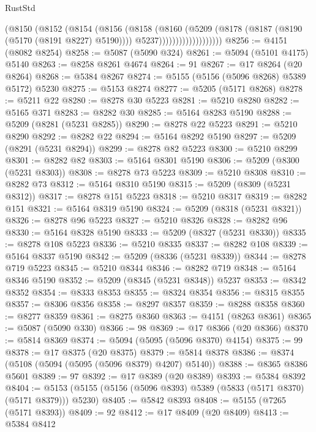 \begin{lexlean}{RustStd}
\begin{coremodule}
                            (@8150
                              (@8152
                                (@8154
                                  (@8156
                                    (@8158
                                      (@8160
                                        (@5209
                                          (@8178 (@8187 (@8190 (@5170 (@8191 @8227) @5190))))
                                          @5237)))))))))))))))))))
@8256 := @4151 (@8082 @8254)
@8258 := @5087 (@5090 @324)
@8261 := @5094 (@5101 @4175) @5140
@8263 := @8258 @8261 @4674
@8264 := 91
@8267 := @17 @8264 (@20 @8264)
@8268 := @5384 @8267
@8274 := @5155 (@5156 (@5096 @8268) @5389 @5172) @5230
@8275 := @5153 @8274
@8277 := @5205 (@5171 @8268)
@8278 := @5211 @22
@8280 := @8278 @30 @5223
@8281 := @5210 @8280
@8282 := @5165 @371
@8283 := @8282 @30
@8285 := @5164 @8283 @5190
@8288 := @5209 (@8281 (@5231 @8285))
@8290 := @8278 @22 @5223
@8291 := @5210 @8290
@8292 := @8282 @22
@8294 := @5164 @8292 @5190
@8297 := @5209 (@8291 (@5231 @8294))
@8299 := @8278 @82 @5223
@8300 := @5210 @8299
@8301 := @8282 @82
@8303 := @5164 @8301 @5190
@8306 := @5209 (@8300 (@5231 @8303))
@8308 := @8278 @73 @5223
@8309 := @5210 @8308
@8310 := @8282 @73
@8312 := @5164 @8310 @5190
@8315 := @5209 (@8309 (@5231 @8312))
@8317 := @8278 @151 @5223
@8318 := @5210 @8317
@8319 := @8282 @151
@8321 := @5164 @8319 @5190
@8324 := @5209 (@8318 (@5231 @8321))
@8326 := @8278 @96 @5223
@8327 := @5210 @8326
@8328 := @8282 @96
@8330 := @5164 @8328 @5190
@8333 := @5209 (@8327 (@5231 @8330))
@8335 := @8278 @108 @5223
@8336 := @5210 @8335
@8337 := @8282 @108
@8339 := @5164 @8337 @5190
@8342 := @5209 (@8336 (@5231 @8339))
@8344 := @8278 @719 @5223
@8345 := @5210 @8344
@8346 := @8282 @719
@8348 := @5164 @8346 @5190
@8352 := @5209 (@8345 (@5231 @8348)) @5237
@8353 := @8342 @8352
@8354 := @8333 @8353
@8355 := @8324 @8354
@8356 := @8315 @8355
@8357 := @8306 @8356
@8358 := @8297 @8357
@8359 := @8288 @8358
@8360 := @8277 @8359
@8361 := @8275 @8360
@8363 := @4151 (@8263 @8361)
@8365 := @5087 (@5090 @330)
@8366 := 98
@8369 := @17 @8366 (@20 @8366)
@8370 := @5814 @8369
@8374 := @5094 (@5095 (@5096 @8370) @4154)
@8375 := 99
@8378 := @17 @8375 (@20 @8375)
@8379 := @5814 @8378
@8386 := @8374 (@5108 (@5094 (@5095 (@5096 @8379) @4207) @5140))
@8388 := @8365 @8386 @5601
@8389 := 97
@8392 := @17 @8389 (@20 @8389)
@8393 := @5384 @8392
@8404 := @5153 (@5155 (@5156 (@5096 @8393) @5389 (@5833 (@5171 @8370) (@5171 @8379))) @5230)
@8405 := @5842 @8393
@8408 := @5155 (@7265 (@5171 @8393))
@8409 := 92
@8412 := @17 @8409 (@20 @8409)
@8413 := @5384 @8412

\end{coremodule}
\end{lexlean}

